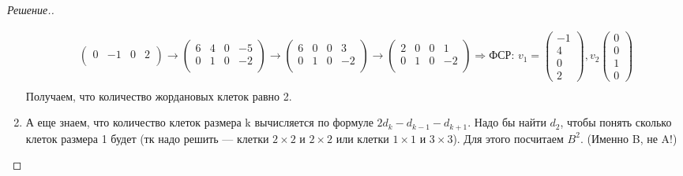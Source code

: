 \documentclass[a4paper]{article}
\theoremstyle{remark}
\begin{document}
\begin{proof}[Решение.]
\begin{enumerate}
\begin{multline*}
\begin{pmatrix}
                        0 & -1 & 0 & 2 \\
                    \end{pmatrix} \to 
                    \begin{pmatrix}
                        6 & 4 & 0 & -5 \\
                        0 & 1 & 0 & -2 \\
                    \end{pmatrix}
                    \to 
                    \begin{pmatrix}
                        6 & 0 & 0 & 3 \\
                        0 & 1 & 0 & -2 \\
                    \end{pmatrix}
                    \to 
                    \begin{pmatrix}
                        2 & 0 & 0 & 1 \\
                        0 & 1 & 0 & -2 \\
                    \end{pmatrix} 
                     \Rightarrow
                    \text{ФСР: }
                    v_1 = \begin{pmatrix}
                        -1\\
                        4\\
                        0\\
                        2
                    \end{pmatrix}, v_2
                    \begin{pmatrix}
                        0\\
                        0\\
                        1\\
                        0
                    \end{pmatrix}\\
                \end{multline*}
                Получаем, что количество жордановых клеток равно 2.
                \item А еще знаем, что количество клеток размера k вычисляется по формуле 
                $2d_k - d_{k- 1} - d_{k + 1}$. Надо бы найти $d_2$, 
                чтобы понять сколько клеток размера 1 будет (тк надо решить --- клетки $2 \times 2$ и $2 \times 2$ или клетки 
                $1 \times 1$ и $3 \times 3$).
                Для этого посчитаем $B^2$. (Именно B, не A!)

\end{enumerate}
\end{proof}
\end{document}
